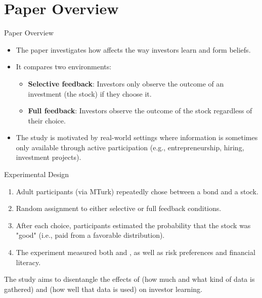 \section{Paper Overview}

\begin{frame}{Paper Overview}
    \begin{itemize}
      \item The paper investigates how  affects the way investors learn and form beliefs.
      
      \bigskip
      \item It compares two environments:
        \begin{itemize}
          \item \textbf{Selective feedback}: Investors only observe the outcome of an investment (the stock) if they choose it.
          \item \textbf{Full feedback}: Investors observe the outcome of the stock regardless of their choice.
        \end{itemize}
        
        \bigskip
      \item The study is motivated by real-world settings where information is sometimes only available through active participation (e.g., entrepreneurship, hiring, investment projects).
    \end{itemize}
  \end{frame}

\begin{frame}{Experimental Design}
    \begin{enumerate}
        \item Adult participants (via MTurk) repeatedly chose between a bond and a stock.
        
        \medskip
        \item Random assignment to either selective or full feedback conditions.
        
        \medskip
        \item After each choice, participants estimated the probability that the stock was "good" (i.e., paid from a favorable distribution).
        
        \medskip
        \item The experiment measured both  and , as well as risk preferences and financial literacy.
      \end{enumerate}

      \bigskip
      The study aims to disentangle the effects of  (how much and what kind of data is gathered) and  (how well that data is used) on investor learning.
\end{frame}
 

